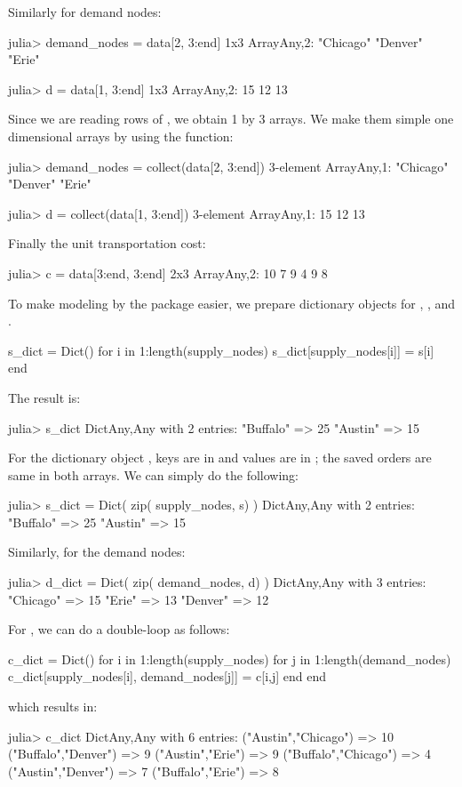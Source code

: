 Similarly for demand nodes:
\begin{code}
julia> demand_nodes = data[2, 3:end]
1x3 Array{Any,2}:
 "Chicago"  "Denver"  "Erie"

julia> d = data[1, 3:end]
1x3 Array{Any,2}:
 15  12  13
\end{code}


Since we are reading rows of , we obtain 1 by 3 arrays. We make them simple one dimensional arrays by using the  function:
\begin{code}
julia> demand_nodes = collect(data[2, 3:end])
3-element Array{Any,1}:
 "Chicago"
 "Denver"
 "Erie"

julia> d = collect(data[1, 3:end])
3-element Array{Any,1}:
 15
 12
 13
\end{code}

Finally the unit transportation cost:
\begin{code}
julia> c = data[3:end, 3:end]
2x3 Array{Any,2}:
 10  7  9
  4  9  8
\end{code}




To make modeling by the \jump{} package easier, we prepare dictionary objects for , , and .
\begin{code}
s_dict = Dict()
for i in 1:length(supply_nodes)
	s_dict[supply_nodes[i]] = s[i]
end
\end{code}
\noindent The result is:
\begin{code}
julia> s_dict
Dict{Any,Any} with 2 entries:
  "Buffalo" => 25
  "Austin"  => 15
\end{code}

For the dictionary object , keys are in  and values are in ; the saved orders are same in both arrays. We can simply do the following:
\begin{code}
julia> s_dict = Dict( zip( supply_nodes, s) )
Dict{Any,Any} with 2 entries:
  "Buffalo" => 25
  "Austin"  => 15
\end{code}

Similarly, for the demand nodes:
\begin{code}
julia> d_dict = Dict( zip( demand_nodes, d) )
Dict{Any,Any} with 3 entries:
  "Chicago" => 15
  "Erie"    => 13
  "Denver"  => 12
\end{code}

For , we can do a double-loop as follows:
\begin{code}
c_dict = Dict()
for i in 1:length(supply_nodes)
    for j in 1:length(demand_nodes)
        c_dict[supply_nodes[i], demand_nodes[j]] = c[i,j]
    end
end
\end{code}
\noindent which results in:
\begin{code}
julia> c_dict
Dict{Any,Any} with 6 entries:
  ("Austin","Chicago")  => 10
  ("Buffalo","Denver")  => 9
  ("Austin","Erie")     => 9
  ("Buffalo","Chicago") => 4
  ("Austin","Denver")   => 7
  ("Buffalo","Erie")    => 8
\end{code}

